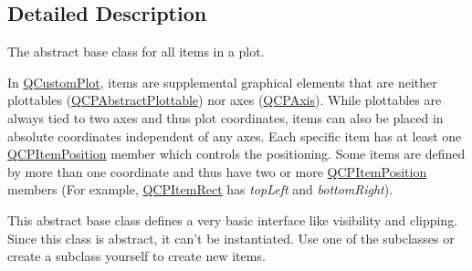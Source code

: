 \subsection{Detailed Description}
The abstract base class for all items in a plot. 

In \hyperlink{classQCustomPlot}{Q\-Custom\-Plot}, items are supplemental graphical elements that are neither plottables (\hyperlink{classQCPAbstractPlottable}{Q\-C\-P\-Abstract\-Plottable}) nor axes (\hyperlink{classQCPAxis}{Q\-C\-P\-Axis}). While plottables are always tied to two axes and thus plot coordinates, items can also be placed in absolute coordinates independent of any axes. Each specific item has at least one \hyperlink{classQCPItemPosition}{Q\-C\-P\-Item\-Position} member which controls the positioning. Some items are defined by more than one coordinate and thus have two or more \hyperlink{classQCPItemPosition}{Q\-C\-P\-Item\-Position} members (For example, \hyperlink{classQCPItemRect}{Q\-C\-P\-Item\-Rect} has {\itshape top\-Left} and {\itshape bottom\-Right}).

This abstract base class defines a very basic interface like visibility and clipping. Since this class is abstract, it can't be instantiated. Use one of the subclasses or create a subclass yourself to create new items.

